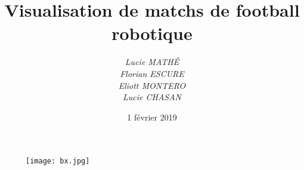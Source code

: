 \documentclass[a4paper,12pt]{report}
\title{Visualisation de matchs de football robotique}
\author{ 
\textit{Lucie MATHÉ}\\
\textit{Florian ESCURE}\\
\textit{Eliott MONTERO}\\
\textit{Lucie CHASAN}
}
\date{1\up{er} février 2019}
\begin{document}
\begin{figure}[!b]
\centering 
\texttt{[image: bx.jpg]}
\end{figure}  

\maketitle

\newpage
\end{document}
